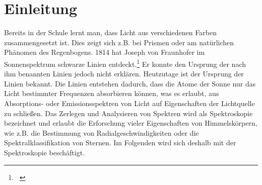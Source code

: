 \section{Einleitung}
Bereits in der Schule lernt man, dass Licht aus verschiedenen Farben zusammengesetzt ist. Dies zeigt sich z.B. bei Prismen oder am natürlichen Phänomen des Regenbogens. 1814 hat Joseph von Fraunhofer im Sonnenspektrum schwarze Linien entdeckt.\footnote{\ \cite{ktroskopie}} Er konnte den Ursprung der nach ihm benannten Linien jedoch nicht erklären. Heutzutage ist der Ursprung der Linien bekannt. Die Linien entstehen dadurch, dass die Atome der Sonne nur das Licht bestimmter Frequenzen absorbieren können, was es erlaubt, aus Absorptions- oder Emissionsspektren von Licht auf Eigenschaften der Lichtquelle zu schließen. Das Zerlegen und Analysieren von Spektren wird als Spektroskopie bezeichnet und erlaubt die Erforschung vieler Eigenschaften von Himmelskörpern, wie z.B. die Bestimmung von Radialgeschwindigkeiten oder die Spektralklassifikation von Sternen. Im Folgenden wird sich deshalb mit der Spektroskopie beschäftigt.